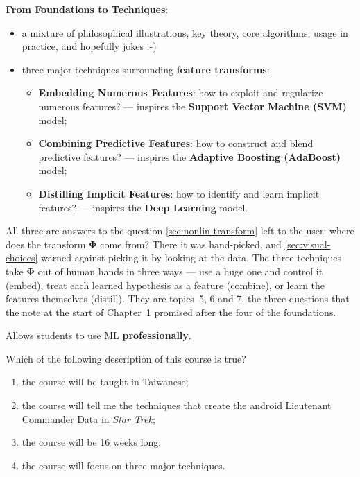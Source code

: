 \textbf{From Foundations to Techniques}:
\begin{itemize}
    \item a mixture of philosophical illustrations, key theory, core
        algorithms, usage in practice, and hopefully jokes :-)
    \item three major techniques surrounding \textbf{feature transforms}:
        \begin{itemize}
            \item \textbf{Embedding Numerous Features}: how to exploit and
                regularize numerous features? --- inspires the
                \textbf{Support Vector Machine (SVM)} model;
            \item \textbf{Combining Predictive Features}: how to construct
                and blend predictive features? --- inspires the
                \textbf{Adaptive Boosting (AdaBoost)} model;
            \item \textbf{Distilling Implicit Features}: how to identify and
                learn implicit features? --- inspires the \textbf{Deep
                Learning} model.
        \end{itemize}
\end{itemize}

All three are answers to the question \autoref{sec:nonlin-transform} left to
the user: where does the transform \(\bm{\Phi}\) come from? There it was
hand-picked, and \autoref{sec:visual-choices} warned against picking it by
looking at the data. The three techniques take \(\bm{\Phi}\) out of human
hands in three ways --- use a huge one and control it (embed), treat each
learned hypothesis as a feature (combine), or learn the features themselves
(distill). They are topics~5, 6 and 7, the three questions
that the note at the start of Chapter~1 promised after the four of the
foundations.

\begin{moral}
    Allows students to use ML \textbf{professionally}.
\end{moral}

\begin{exercise}
    Which of the following description of this course is true?
    \begin{enumerate}[(1)]
        \item the course will be taught in Taiwanese;
        \item the course will tell me the techniques that create the android
            Lieutenant Commander Data in \emph{Star Trek};
        \item the course will be 16 weeks long;
        \item the course will focus on three major techniques.
    \end{enumerate}
\end{exercise}

